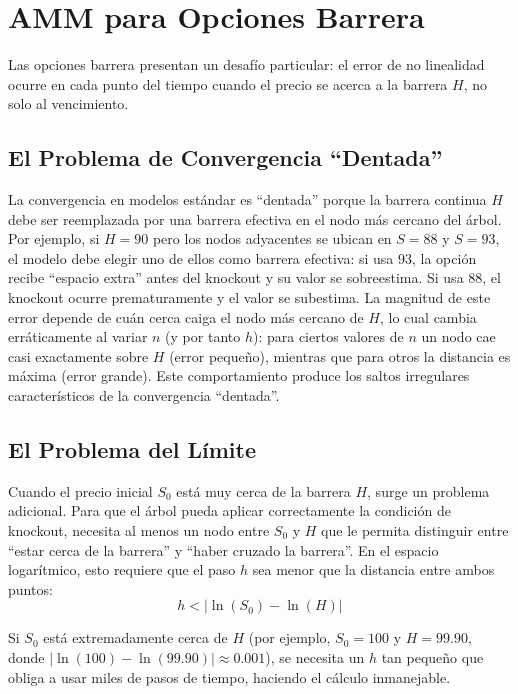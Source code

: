 \section{AMM para Opciones Barrera}
\label{sec:amm_barrier}

Las opciones barrera presentan un desafío particular: el error de no linealidad ocurre en cada punto del tiempo cuando el precio se acerca a la barrera $H$, no solo al vencimiento.

\subsection{El Problema de Convergencia ``Dentada''}

La convergencia en modelos estándar es ``dentada'' porque la barrera continua $H$ debe ser reemplazada por una barrera efectiva en el nodo más cercano del árbol. Por ejemplo, si $H=90$ pero los nodos adyacentes se ubican en $S=88$ y $S=93$, el modelo debe elegir uno de ellos como barrera efectiva: si usa 93, la opción recibe ``espacio extra'' antes del knockout y su valor se sobreestima. Si usa 88, el knockout ocurre prematuramente y el valor se subestima. La magnitud de este error depende de cuán cerca caiga el nodo más cercano de $H$, lo cual cambia erráticamente al variar $n$ (y por tanto $h$): para ciertos valores de $n$ un nodo cae casi exactamente sobre $H$ (error pequeño), mientras que para otros la distancia es máxima (error grande). Este comportamiento produce los saltos irregulares característicos de la convergencia ``dentada''.

\subsection{El Problema del Límite}

Cuando el precio inicial $S_0$ está muy cerca de la barrera $H$, surge un problema adicional. Para que el árbol pueda aplicar correctamente la condición de knockout, necesita al menos un nodo entre $S_0$ y $H$ que le permita distinguir entre ``estar cerca de la barrera'' y ``haber cruzado la barrera''. En el espacio logarítmico, esto requiere que el paso $h$ sea menor que la distancia entre ambos puntos:
\begin{equation}
h < |\ln(S_0) - \ln(H)|
\end{equation}

Si $S_0$ está extremadamente cerca de $H$ (por ejemplo, $S_0=100$ y $H=99.90$, donde $|\ln(100) - \ln(99.90)| \approx 0.001$), se necesita un $h$ tan pequeño que obliga a usar miles de pasos de tiempo, haciendo el cálculo inmanejable.

